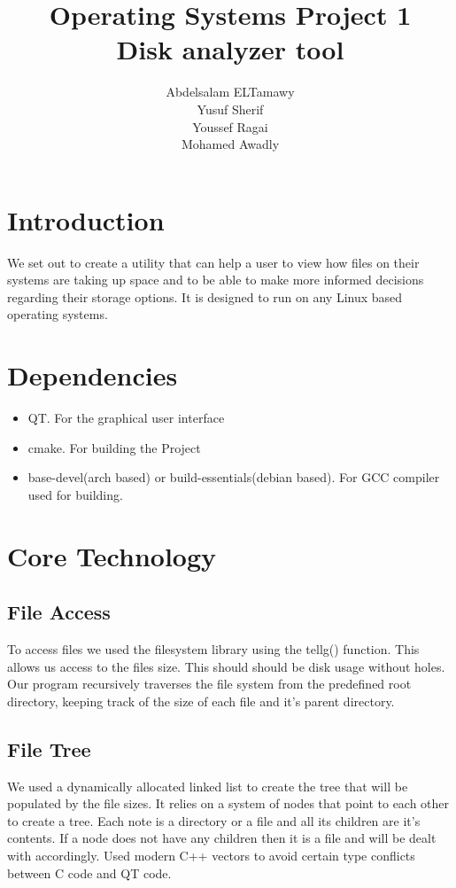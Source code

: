 \documentclass[]{article}
\author{Abdelsalam ELTamawy\\Yusuf Sherif\\Youssef Ragai\\Mohamed Awadly}
\title{Operating Systems Project 1\\Disk analyzer tool}
\begin{document}
    \begin{titlepage}

        \maketitle
    \end{titlepage}

    \section{Introduction}
    We set out to create a utility that can help a user to view how files on their systems are taking up space and to be able to make more informed decisions regarding their storage options.
    It is designed to run on any Linux based operating systems.

    \section{Dependencies}
    \begin{itemize}
        \item QT. For the graphical user interface
        \item cmake. For building the Project
        \item base-devel(arch based) or build-essentials(debian based). For GCC compiler used for building.
    \end{itemize}

    \section{Core Technology}
    \subsection{File Access}
    To access files we used the filesystem library using the tellg() function.
    This allows us access to the files size. This should should be disk usage without holes. Our program recursively traverses the file system from the predefined root directory, keeping track of the size of each file and it's parent directory.

    \subsection{File Tree}
    We used a dynamically allocated linked list to create the tree that will be populated by the file sizes. It relies on a system of nodes that point to each other to create a tree. Each note is a directory or a file and all its children are it's contents.
    If a node does not have any children then it is a file and will be dealt with accordingly. Used modern C++ vectors to avoid certain type conflicts between C code and QT code.
\end{document}
